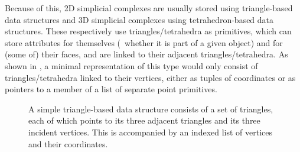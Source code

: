 Because of this, 2D simplicial complexes are usually stored using triangle-based data structures and 3D simplicial complexes using tetrahedron-based data structures.
These respectively use triangles/tetrahedra as primitives, which can store attributes for themselves (\eg\ whether it is part of a given object) and for (some of) their faces, and are linked to their adjacent triangles/tetrahedra.
As shown in , a minimal representation of this type would only consist of triangles/tetrahedra linked to their vertices, either as tuples of coordinates or as pointers to a member of a list of separate point primitives.
\begin{figure}[b]
\centering
{}
\quad
{}
\quad
{}
\caption[A triangle-based data structure]{A simple triangle-based data structure consists of a set of triangles, each of which points to its three adjacent triangles and its three incident vertices.
This is accompanied by an indexed list of vertices and their coordinates.}
\label{fig:2-simplex}
\end{figure}

